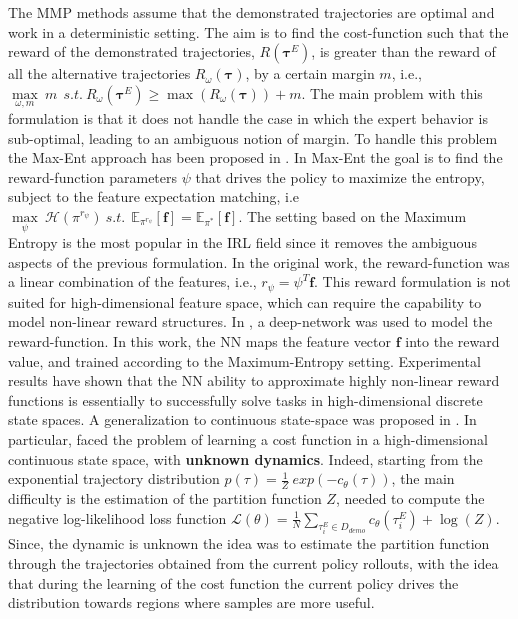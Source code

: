 The MMP methods assume that the demonstrated trajectories are optimal and work in a deterministic setting. The aim is to find the cost-function such that the reward of the demonstrated trajectories, $R(\boldsymbol{\tau}^{E})$, is greater than the reward of all the alternative trajectories $R_{\omega}(\boldsymbol{\tau})$, by a certain margin $m$, i.e., $ \underset{\omega, m}{\max} \ m \  \ s.t. \ R_{\omega}(\boldsymbol{\tau}^{E}) \geq \max (R_{\omega}(\boldsymbol{\tau})) + m$. The main problem with this formulation is that it does not handle the case in which the expert behavior is sub-optimal, leading to an ambiguous notion of margin. To handle this problem the Max-Ent approach has been proposed in \cite{ziebart2008maximum_entropy}. In Max-Ent the goal is to find the reward-function parameters $\psi$ that drives the policy to maximize the entropy, subject to the feature expectation matching, i.e $\underset{\psi}{\max} \ \mathcal{H}(\pi^{r_{\psi}}) \ s.t. \ \ \mathbb{E}_{\pi^{r_{\psi}}}[\mathbf{f}] = \mathbb{E}_{\pi^{*}}[\mathbf{f}]$. The setting based on the Maximum Entropy is the most popular in the IRL field since it removes the ambiguous aspects of the previous formulation. In the original work, the reward-function was a linear combination of the features, i.e., $r_{\psi} = \psi^T \mathbf{f}$. This reward formulation is not suited for high-dimensional feature space, which can require the capability to model non-linear reward structures. In \cite{wulfmeier2015deep_inverse_rl}, a deep-network was used to model the reward-function. In this work, the NN maps the feature vector $\textbf{f}$ into the reward value, and trained according to the Maximum-Entropy setting. Experimental results have shown that the NN ability to approximate highly non-linear reward functions is essentially to successfully solve tasks in high-dimensional discrete state spaces. A generalization to continuous state-space was proposed in \cite{finn2016guided_cost_learning}. In particular, \cite{finn2016guided_cost_learning} faced the problem of learning a cost function in a high-dimensional continuous state space, with \textbf{unknown dynamics}. Indeed, starting from the exponential trajectory distribution $p(\tau) = \frac{1}{Z} \ exp(-c_{\theta}(\tau))$, the main difficulty is the estimation of the partition function $Z$, needed to compute the negative log-likelihood loss function $\mathcal{L}(\theta) = \frac{1}{N} \underset{\tau^{E}_{i} \in D_{demo}}{\sum} c_{\theta}(\tau^{E}_{i}) + \log(Z)$. Since, the dynamic is unknown the idea was to estimate the partition function through the trajectories obtained from the current policy rollouts, with the idea that during the learning of the cost function the current policy drives the distribution towards regions where samples are more useful.%

